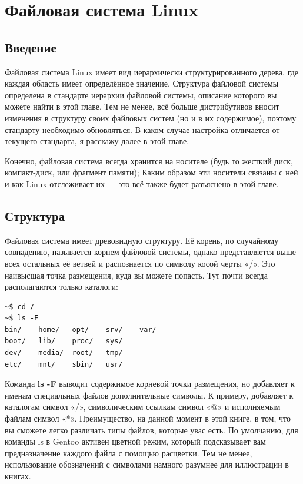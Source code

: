 \documentclass[10pt]{book}
\begin{document}
\chapter{Файловая система Linux}

\section*{Введение}

Файловая система Linux имеет вид иерархически структурированного дерева, где каждая область имеет определённое значение. Структура файловой системы  определена в стандарте иерархии файловой системы, описание которого вы можете найти в этой главе. Тем не менее, всё больше дистрибутивов вносит изменения в структуру своих файловых систем (но и в их содержимое), поэтому стандарту необходимо обновляться. В каком случае настройка отличается от текущего стандарта, я расскажу далее в этой главе.

Конечно, файловая система всегда хранится на носителе (будь то жесткий диск, компакт-диск, или фрагмент памяти); Каким образом эти носители связаны с ней и как Linux отслеживает их — это всё также будет разъяснено в этой главе.

\section{Структура}

Файловая система имеет древовидную структуру. Её корень, по случайному совпадению, называется корнем файловой системы, однако представляется выше всех остальных её ветвей и распознается по символу косой черты «/». Это наивысшая точка размещения, куда вы можете попасть. Тут почти всегда располагаются только каталоги:

\vspace{3mm}
\begin{tcolorbox}
\begin{lstlisting}
~$ cd /
~$ ls -F
bin/	home/	opt/	srv/	var/
boot/	lib/	proc/	sys/
dev/	media/	root/	tmp/
etc/	mnt/	sbin/	usr/
\end{lstlisting}
\end{tcolorbox}

Команда \textbf{ls -F} выводит содержимое корневой точки размещения, но добавляет к именам специальных файлов дополнительные символы. К примеру, добавляет к   каталогам символ «/», символическим ссылкам символ «@» и исполняемым файлам символ «*». Преимущество, на данной момент в этой книге, в том, что вы сможете легко различать типы файлов, которые увас есть. По умолчанию, для команды ls в Gentoo активен цветной режим, который подсказывает вам предназначение каждого файла с помощью расцветки. Тем не менее, нспользование обозначений с символами намного разумнее для иллюстрации в книгах.
\end{document}
